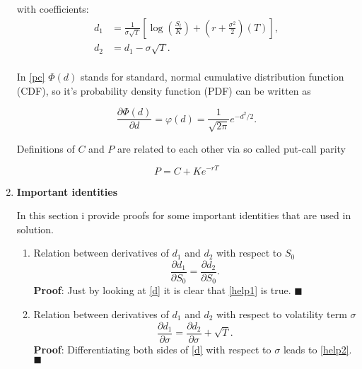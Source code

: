 \documentclass[12pt]{article}
\begin{document}
\begin{enumerate}[leftmargin=\labelsep]
with coefficients:
\begin{equation}
\begin{split}\label{d}
     d_1 &= \frac{1}{\sigma\sqrt{T}}\left[\log\left(\frac{S_t}{K}\right) + \left(r + \frac{\sigma^2}{2}\right)(T)\right], \\
     d_2 &= d_1 - \sigma\sqrt{T}. \\
\end{split}
\end{equation}

In \eqref{pc} $\Phi(d)$ stands for standard, normal cumulative distribution function (CDF), so it's probability density function (PDF) can be written as

\begin{equation}\label{pdf}
\frac{\partial \Phi(d)}{\partial d} = \varphi(d) = 
\frac{1}{\sqrt{2\pi}}  e^{-d^2/2}.
\end{equation}

Definitions of $C$ and $P$ are related to each other via so called put-call parity

\begin{equation}
    P = C + K e^{-rT}
\end{equation}

\item \textbf{Important identities}

In this section i provide proofs for some important identities that are used in solution.

\begin{enumerate}

    \item Relation between derivatives of $d_1$ and $d_2$ with respect to $S_0$
    \begin{equation}\label{help1}
        \frac{\partial d_1}{\partial S_0} = \frac{\partial d_2}{\partial S_0}.
    \end{equation}
    \textbf{Proof}: Just by looking at \eqref{d} it is clear that \eqref{help1} is true.  $\blacksquare$

     \item Relation between derivatives of $d_1$ and $d_2$ with respect to volatility term $\sigma$
    \begin{equation}\label{help2}
        \frac{\partial d_1}{\partial \sigma} = \frac{\partial d_2}{\partial \sigma} + \sqrt{T}.
    \end{equation}
    \textbf{Proof}: Differentiating both sides of \eqref{d} with respect to $\sigma$ leads to \eqref{help2}.  $\blacksquare$


\end{enumerate}
\end{enumerate}
\end{document}

